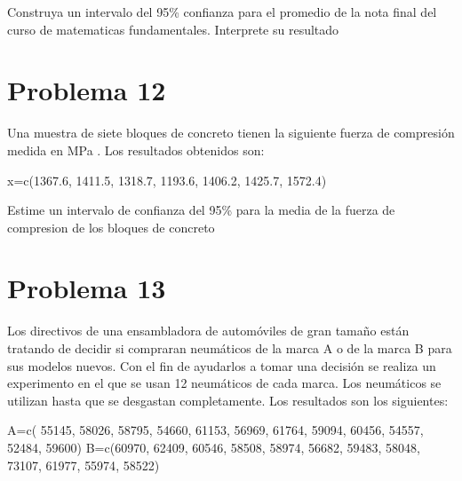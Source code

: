 \documentclass[
]{article}
\newenvironment{Shaded}{\begin{snugshade}}{\end{snugshade}}
\newcommand{\DecValTok}[1]{\textcolor[rgb]{0.00,0.00,0.81}{#1}}
\newcommand{\FloatTok}[1]{\textcolor[rgb]{0.00,0.00,0.81}{#1}}
\newcommand{\FunctionTok}[1]{\textcolor[rgb]{0.00,0.00,0.00}{#1}}
\newcommand{\NormalTok}[1]{#1}
\newcommand{\OtherTok}[1]{\textcolor[rgb]{0.56,0.35,0.01}{#1}}
\begin{document}
Construya un intervalo del 95\% confianza para el promedio de la nota
final del curso de matematicas fundamentales. Interprete su resultado

\hypertarget{problema-12}{%
\section{\texorpdfstring{\textbf{Problema
12}}{Problema 12}}\label{problema-12}}

Una muestra de siete bloques de concreto tienen la siguiente fuerza de
compresión medida en MPa . Los resultados obtenidos son:

\begin{Shaded}
\begin{Highlighting}[]
\NormalTok{x}\OtherTok{=}\FunctionTok{c}\NormalTok{(}\FloatTok{1367.6}\NormalTok{, }\FloatTok{1411.5}\NormalTok{, }\FloatTok{1318.7}\NormalTok{, }\FloatTok{1193.6}\NormalTok{, }\FloatTok{1406.2}\NormalTok{, }\FloatTok{1425.7}\NormalTok{, }\FloatTok{1572.4}\NormalTok{)}
\end{Highlighting}
\end{Shaded}

Estime un intervalo de confianza del 95\% para la media de la fuerza de
compresion de los bloques de concreto

\hypertarget{problema-13}{%
\section{\texorpdfstring{\textbf{Problema
13}}{Problema 13}}\label{problema-13}}

Los directivos de una ensambladora de automóviles de gran tamaño están
tratando de decidir si compraran neumáticos de la marca A o de la marca
B para sus modelos nuevos. Con el fin de ayudarlos a tomar una decisión
se realiza un experimento en el que se usan 12 neumáticos de cada marca.
Los neumáticos se utilizan hasta que se desgastan completamente. Los
resultados son los siguientes:

\begin{Shaded}
\begin{Highlighting}[]
\NormalTok{A}\OtherTok{=}\FunctionTok{c}\NormalTok{(  }\DecValTok{55145}\NormalTok{, }\DecValTok{58026}\NormalTok{, }\DecValTok{58795}\NormalTok{, }\DecValTok{54660}\NormalTok{, }\DecValTok{61153}\NormalTok{, }\DecValTok{56969}\NormalTok{, }\DecValTok{61764}\NormalTok{, }\DecValTok{59094}\NormalTok{, }\DecValTok{60456}\NormalTok{, }\DecValTok{54557}\NormalTok{, }\DecValTok{52484}\NormalTok{, }\DecValTok{59600}\NormalTok{)}
\NormalTok{B}\OtherTok{=}\FunctionTok{c}\NormalTok{(}\DecValTok{60970}\NormalTok{, }\DecValTok{62409}\NormalTok{, }\DecValTok{60546}\NormalTok{, }\DecValTok{58508}\NormalTok{, }\DecValTok{58974}\NormalTok{, }\DecValTok{56682}\NormalTok{, }\DecValTok{59483}\NormalTok{, }\DecValTok{58048}\NormalTok{, }\DecValTok{73107}\NormalTok{, }\DecValTok{61977}\NormalTok{, }\DecValTok{55974}\NormalTok{, }\DecValTok{58522}\NormalTok{)}
\end{Highlighting}
\end{Shaded}
\end{document}
